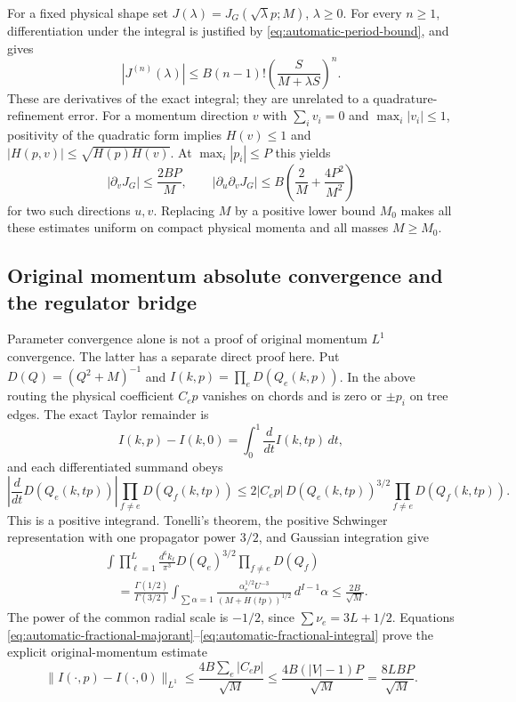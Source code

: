 For a fixed physical shape set $J(\lambda)=J_G(\sqrt\lambda p;M)$,
$\lambda\geq0$.  For every $n\geq1$, differentiation under the integral is
justified by \eqref{eq:automatic-period-bound}, and gives
\begin{equation}
 |J^{(n)}(\lambda)|
 \leq B(n-1)!\left(\frac{S}{M+\lambda S}\right)^n.
 \label{eq:automatic-scale-derivative}
\end{equation}
These are derivatives of the exact integral; they are unrelated to a
quadrature-refinement error.  For a momentum direction $v$ with
$\sum_i v_i=0$ and $\max_i|v_i|\leq1$, positivity of the quadratic form
implies $H(v)\leq1$ and
$|H(p,v)|\leq\sqrt{H(p)H(v)}$.  At $\max_i|p_i|\leq P$ this yields
\begin{equation}
 |\partial_vJ_G|\leq\frac{2BP}{M},\qquad
 |\partial_u\partial_vJ_G|
 \leq B\left(\frac{2}{M}+\frac{4P^2}{M^2}\right)
 \label{eq:automatic-cartesian-derivatives}
\end{equation}
for two such directions $u,v$.  Replacing $M$ by a positive lower bound
$M_0$ makes all these estimates uniform on compact physical momenta and
all masses $M\geq M_0$.

\subsection{Original momentum absolute convergence and the regulator bridge}

Parameter convergence alone is not a proof of original momentum $L^1$
convergence.  The latter has a separate direct proof here.  Put
$D(Q)=(Q^2+M)^{-1}$ and
$I(k,p)=\prod_eD(Q_e(k,p))$.  In the above routing the physical coefficient
$C_ep$ vanishes on chords and is zero or $\pm p_i$ on tree edges.
The exact Taylor remainder is
\begin{equation}
 I(k,p)-I(k,0)=\int_0^1\frac{d}{dt}I(k,tp)\,dt,
\end{equation}
and each differentiated summand obeys
\begin{equation}
 \left|\frac{d}{dt}D(Q_e(k,tp))\right|
 \prod_{f\ne e}D(Q_f(k,tp))
 \leq 2|C_ep|\,D(Q_e(k,tp))^{3/2}
             \prod_{f\ne e}D(Q_f(k,tp)).
 \label{eq:automatic-fractional-majorant}
\end{equation}
This is a positive integrand.  Tonelli's theorem, the positive Schwinger
representation with one propagator power $3/2$, and Gaussian integration
give
\begin{align}
 &\int\prod_{\ell=1}^L\frac{d^6k_\ell}{\pi^3}
 D(Q_e)^{3/2}\prod_{f\ne e}D(Q_f)\\
 &\quad=\frac{\Gamma(1/2)}{\Gamma(3/2)}
 \int_{\sum\alpha=1}
 \frac{\alpha_e^{1/2}U^{-3}}{(M+H(tp))^{1/2}}\,d^{I-1}\alpha
 \leq\frac{2B}{\sqrt M}.
 \label{eq:automatic-fractional-integral}
\end{align}
The power of the common radial scale is $-1/2$, since
$\sum\nu_e=3L+1/2$.  Equations
\eqref{eq:automatic-fractional-majorant}--\eqref{eq:automatic-fractional-integral}
prove the explicit original-momentum estimate
\begin{equation}
 \|I(\cdot,p)-I(\cdot,0)\|_{L^1}
 \leq\frac{4B\sum_e|C_ep|}{\sqrt M}
 \leq\frac{4B(|V|-1)P}{\sqrt M}
 =\frac{8LBP}{\sqrt M}.
 \label{eq:automatic-momentum-l1}
\end{equation}

